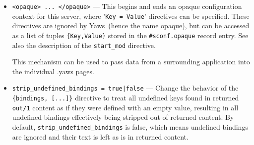 \documentclass[11pt,oneside,english]{book}
\newcommand{\Yaws}            %
        {{\sc Yaws}}
\begin{document}
\begin{itemize}
\begin{itemize}
                Ordering is one of (Default value is \verb+deny,allow+):
                \begin{itemize}
                  \item \verb+allow,deny+ --- First, all \verb+allow+ directives
                    are evaluated; at least one must match, or the request is
                    rejected. Next, \verb+deny+ directives are evaluated. If any
                    matches, the request is rejected. Last, any requests which
                    do not match an \verb+allow+ or a \verb+deny+ directive are
                    denied by default.

                  \item \verb+deny,allow+ --- First, all \verb+deny+ directives
                    are evaluated; if any matches, the request is denied unless
                    it also matches an \verb+allow+ directive. Any requests
                    which do not match any \verb+allow+ or \verb+deny+
                    directives are permitted.
                \end{itemize}
              \end{itemize}

\item       \verb+<opaque> ... </opaque>+ ---
              This begins and ends an opaque configuration context for this
              server, where '\verb+Key = Value+' directives can be
              specified. These directives are ignored by \Yaws\ (hence the name
              opaque), but can be accessed as a list of tuples
              \verb+{Key,Value}+ stored in the \verb+#sconf.opaque+ record
              entry. See also the description of the \verb+start_mod+ directive.

              This mechanism can be used to pass data from a surrounding
              application into the individual .yaws pages.

\item       \verb+strip_undefined_bindings = true|false+ ---
              Change the behavior of the \verb+{bindings, [...]}+
              directive to treat all undefined keys found in returned
              \verb+out/1+ content as if they were defined with an
              empty value, resulting in all undefined bindings
              effectively being stripped out of returned content. By
              default, \verb+strip_undefined_bindings+ is false, which
              means undefined bindings are ignored and their text is
              left as is in returned content.


\end{itemize}
\end{document}
